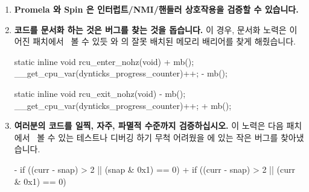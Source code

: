 \begin{enumerate}
\item	{\bf Promela 와 Spin 은 인터럽트\slash NMI\-/핸들러 상호작용을 검증할
	수 있습니다.}
\item	{\bf 코드를 문서화 하는 것은 버그를 찾는 것을 돕습니다.}
	이 경우, 문서화 노력은 이어진
	패치에서~\cite{PaulEMcKenney2008commit:d7c0651390b6} 볼 수 있듯
	 와  의 잘못 배치된 메모리
	배리어를 찾게 해줬습니다.

\iffalse

\item	{\bf Promela and Spin can verify interrupt\slash NMI\-/handler
	interactions.}
\item	{\bf Documenting code can help locate bugs.}
	In this case, the documentation effort located
	a misplaced memory barrier in
	\co{rcu_enter_nohz()} and \co{rcu_exit_nohz()},
	as shown by the following patch~\cite{PaulEMcKenney2008commit:d7c0651390b6}.

\fi

\begin{VerbatimU}
 static inline void rcu_enter_nohz(void)
 {
+       mb();
        __get_cpu_var(dynticks_progress_counter)++;
-       mb();
 }

 static inline void rcu_exit_nohz(void)
 {
-       mb();
        __get_cpu_var(dynticks_progress_counter)++;
+       mb();
 }
\end{VerbatimU}

\item	{\bf 여러분의 코드를 일찍, 자주, 파멸적 수준까지 검증하십시오.}
	이 노력은 다음 패치에서~\cite{PaulEMcKenney2008commit:ae66be9b71b1} 볼
	수 있는 테스트나 디버깅 하기 무척 어려웠을
	 에 있는 작은 버그를 찾아냈습니다.

\iffalse

\item	{\bf Validate your code early, often, and up to the point
	of destruction.}
	This effort located one subtle bug in
	\co{rcu_try_flip_waitack_needed()}
	that would have been quite difficult to test or debug, as
	shown by the following patch~\cite{PaulEMcKenney2008commit:ae66be9b71b1}.

\fi

\begin{VerbatimU}
-       if ((curr - snap) > 2 || (snap & 0x1) == 0)
+       if ((curr - snap) > 2 || (curr & 0x1) == 0)
\end{VerbatimU}


\end{enumerate}
